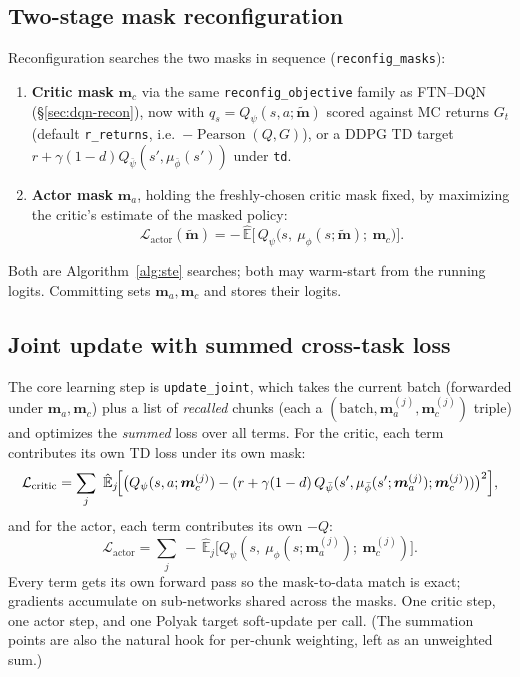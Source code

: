 \documentclass[11pt]{article}
\newcommand{\Ehat}{\hat{\mathbb{E}}}
\newcommand{\obs}{s}
\newcommand{\act}{a}
\newcommand{\mask}{\bm{m}}                 %
\newcommand{\masksoft}{\tilde{\bm{m}}}     %
\newcommand{\code}[1]{\texttt{\small #1}}
\begin{document}
\subsection{Two-stage mask reconfiguration}
\label{sec:ddpg-recon}

Reconfiguration searches the two masks in sequence
(\code{reconfig\_masks}):
\begin{enumerate}[leftmargin=2em,itemsep=1pt]
  \item \textbf{Critic mask} $\mask_c$ via the same
  \code{reconfig\_objective} family as FTN--DQN (\S\ref{sec:dqn-recon}), now with
  $q_{\obs} = Q_\psi(\obs,\act;\masksoft)$ scored against MC returns $G_t$
  (default \code{r\_returns}, i.e.\ $-\operatorname{Pearson}(Q,G)$), or a
  DDPG TD target $r+\gamma(1-d)Q_{\bar\psi}(\obs',\mu_{\bar\phi}(\obs'))$ under
  \code{td}.
  \item \textbf{Actor mask} $\mask_a$, holding the freshly-chosen critic mask
  fixed, by maximizing the critic's estimate of the masked policy:
  \[
  \mathcal L_{\mathrm{actor}}(\masksoft) = -\,\Ehat\bigl[\,Q_\psi\bigl(\obs,\ \mu_\phi(\obs;\masksoft);\ \mask_c\bigr)\bigr].
  \]
\end{enumerate}
Both are Algorithm~\ref{alg:ste} searches; both may warm-start from the running
logits. Committing sets $\mask_a,\mask_c$ and stores their logits.

\subsection{Joint update with summed cross-task loss}
\label{sec:ddpg-update}

The core learning step is \code{update\_joint}, which takes the current batch
(forwarded under $\mask_a,\mask_c$) plus a list of \emph{recalled} chunks (each a
$(\text{batch},\mask_a^{(j)},\mask_c^{(j)})$ triple) and optimizes the
\emph{summed} loss over all terms. For the critic, each term contributes its own
TD loss under its own mask:
\[
\mathcal L_{\mathrm{critic}} = \sum_{j}\ \Ehat_j\!\Bigl[\bigl(Q_\psi(\obs,\act;\mask_c^{(j)}) - (r + \gamma(1-d)\,Q_{\bar\psi}(\obs',\mu_{\bar\phi}(\obs';\mask_a^{(j)});\mask_c^{(j)}))\bigr)^2\Bigr],
\]
and for the actor, each term contributes its own $-Q$:
\[
\mathcal L_{\mathrm{actor}} = \sum_{j}\ -\,\Ehat_j\!\bigl[Q_\psi(\obs,\ \mu_\phi(\obs;\mask_a^{(j)});\ \mask_c^{(j)})\bigr].
\]
Every term gets its own forward pass so the mask-to-data match is exact;
gradients accumulate on sub-networks shared across the masks. One critic step, one
actor step, and one Polyak target soft-update per call. (The summation points are
also the natural hook for per-chunk weighting, left as an unweighted sum.)
\end{document}
